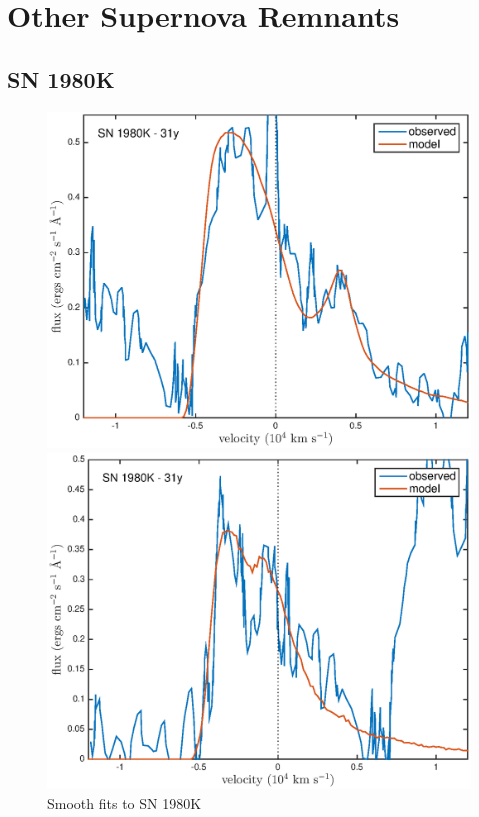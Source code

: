 \chapter{Other Supernova Remnants}\label{chp:chp6}

%
%



\section{SN 1980K}

\begin{figure}
\centering
\includegraphics[scale=0.8,clip=true, trim=20 10 40 20]{chapters/chapter6/figs/80K/Ha_31y}

\includegraphics[scale=0.8,clip=true, trim=20 0 40 20]{chapters/chapter6/figs/80K/OI_31y}
\caption{Smooth fits to SN 1980K}
\label{80K_smooth}
\end{figure}

